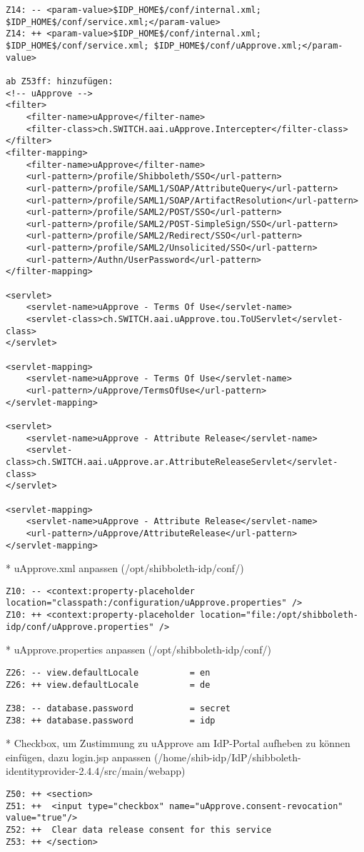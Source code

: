 \begin{lstlisting}
Z14: -- <param-value>$IDP_HOME$/conf/internal.xml; $IDP_HOME$/conf/service.xml;</param-value>
Z14: ++ <param-value>$IDP_HOME$/conf/internal.xml; $IDP_HOME$/conf/service.xml; $IDP_HOME$/conf/uApprove.xml;</param-value>

ab Z53ff: hinzufügen:
<!-- uApprove -->
<filter>
	<filter-name>uApprove</filter-name>
	<filter-class>ch.SWITCH.aai.uApprove.Intercepter</filter-class>
</filter>
<filter-mapping>
	<filter-name>uApprove</filter-name>
	<url-pattern>/profile/Shibboleth/SSO</url-pattern>
	<url-pattern>/profile/SAML1/SOAP/AttributeQuery</url-pattern>
	<url-pattern>/profile/SAML1/SOAP/ArtifactResolution</url-pattern>
	<url-pattern>/profile/SAML2/POST/SSO</url-pattern>
	<url-pattern>/profile/SAML2/POST-SimpleSign/SSO</url-pattern>
	<url-pattern>/profile/SAML2/Redirect/SSO</url-pattern>
	<url-pattern>/profile/SAML2/Unsolicited/SSO</url-pattern>
	<url-pattern>/Authn/UserPassword</url-pattern>
</filter-mapping>

<servlet>
	<servlet-name>uApprove - Terms Of Use</servlet-name>
	<servlet-class>ch.SWITCH.aai.uApprove.tou.ToUServlet</servlet-class>
</servlet>
 
<servlet-mapping>
	<servlet-name>uApprove - Terms Of Use</servlet-name>
	<url-pattern>/uApprove/TermsOfUse</url-pattern>
</servlet-mapping>
 
<servlet>
	<servlet-name>uApprove - Attribute Release</servlet-name>
	<servlet-class>ch.SWITCH.aai.uApprove.ar.AttributeReleaseServlet</servlet-class>
</servlet>
 
<servlet-mapping>
	<servlet-name>uApprove - Attribute Release</servlet-name>
	<url-pattern>/uApprove/AttributeRelease</url-pattern>
</servlet-mapping>
\end{lstlisting}
* uApprove.xml anpassen (/opt/shibboleth-idp/conf/)
\begin{lstlisting}
Z10: -- <context:property-placeholder location="classpath:/configuration/uApprove.properties" />
Z10: ++ <context:property-placeholder location="file:/opt/shibboleth-idp/conf/uApprove.properties" />
\end{lstlisting}
* uApprove.properties anpassen (/opt/shibboleth-idp/conf/)
\begin{lstlisting}
Z26: -- view.defaultLocale          = en
Z26: ++ view.defaultLocale          = de

Z38: -- database.password           = secret
Z38: ++ database.password           = idp
\end{lstlisting}
* Checkbox, um Zustimmung zu uApprove am IdP-Portal aufheben zu können
einfügen, dazu login.jsp anpassen (/home/shib-idp/IdP/shibboleth-identityprovider-2.4.4/src/main/webapp)
\begin{lstlisting}
Z50: ++ <section>
Z51: ++	 <input type="checkbox" name="uApprove.consent-revocation" value="true"/>
Z52: ++	 Clear data release consent for this service
Z53: ++	</section>
\end{lstlisting}
